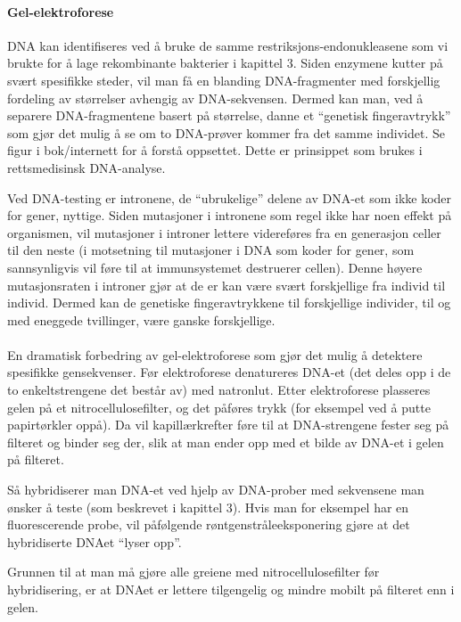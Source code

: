 \paragraph{Gel-elektroforese} DNA kan identifiseres ved å bruke de samme  restriksjons-endonukleasene som vi brukte for å lage rekombinante bakterier i kapittel 3. Siden enzymene kutter på svært spesifikke steder, vil man få en blanding DNA-fragmenter med forskjellig fordeling av størrelser avhengig av DNA-sekvensen. Dermed kan man, ved å separere DNA-fragmentene basert på størrelse, danne et ``genetisk fingeravtrykk'' som gjør det mulig å se om to DNA-prøver kommer fra det samme individet. Se figur i bok/internett for å forstå oppsettet. Dette er prinsippet som brukes i rettsmedisinsk DNA-analyse. 

Ved DNA-testing er intronene,  de ``ubrukelige'' delene av DNA-et som ikke koder for gener, nyttige. Siden mutasjoner i intronene som regel ikke har noen effekt på organismen, vil mutasjoner i introner lettere videreføres fra en generasjon celler til den neste (i motsetning til mutasjoner i DNA som koder for gener, som sannsynligvis vil føre til at immunsystemet destruerer cellen). Denne høyere mutasjonsraten i introner gjør at de er kan være svært forskjellige fra individ til individ. Dermed kan de genetiske fingeravtrykkene til forskjellige individer, til og med eneggede tvillinger, være ganske forskjellige.

\paragraph{} En dramatisk forbedring av gel-elektroforese som gjør det mulig å detektere spesifikke gensekvenser. Før elektroforese denatureres DNA-et (det deles opp i de to enkeltstrengene det består av) med natronlut. Etter elektroforese plasseres gelen på et nitrocellulosefilter, og det påføres trykk (for eksempel ved å putte papirtørkler oppå). Da vil kapillærkrefter føre til at DNA-strengene fester seg på filteret og binder seg der, slik at man ender opp med et bilde av DNA-et i gelen på filteret. 

Så hybridiserer man DNA-et ved hjelp av DNA-prober med sekvensene man ønsker å teste (som beskrevet i kapittel 3). Hvis man for eksempel har en fluorescerende probe, vil påfølgende røntgenstråleeksponering gjøre at det hybridiserte DNAet ``lyser opp''.

Grunnen til at man må gjøre alle greiene med nitrocellulosefilter før hybridisering, er at DNAet er lettere tilgengelig og mindre mobilt på filteret enn i gelen.


